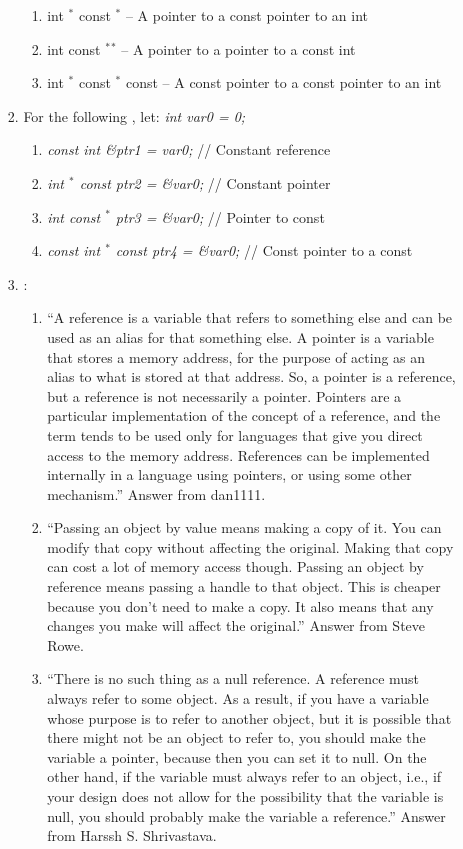\begin{enumerate}
\begin{enumerate}
\begin{enumerate}
\begin{enumerate}
			\item int $^{\ast}$ const $^{\ast}$ -- A pointer to a const pointer to an int
			\item int const $^{\ast}$$^{\ast}$ -- A pointer to a pointer to a const int
			\item int $^{\ast}$ const $^{\ast}$ const -- A const pointer to a const pointer to an int
			\end{enumerate}
		\item For the following \cite{Mortensen2015}, let: {\it int var0 = 0;} \vspace{-0.1cm}
			\begin{enumerate} \itemsep -1pt
			\item {\it const int {\rm \&}ptr1 = var0;} // Constant reference
			\item {\it int $^{\ast}$ const ptr2 = {\rm \&}var0;} // Constant pointer
			\item {\it int const $^{\ast}$ ptr3 = {\rm \&}var0;} // Pointer to const
			\item {\it const int $^{\ast}$ const ptr4 = {\rm \&}var0;} // Const pointer to a const
			\end{enumerate}
		\item \cite{Ozcan2013}: \vspace{-0.1cm}
			\begin{enumerate} \itemsep -1pt
			\item ``A reference is a variable that refers to something else and can be used as an alias for that something else. A pointer is a variable that stores a memory address, for the purpose of acting as an alias to what is stored at that address. So, a pointer is a reference, but a reference is not necessarily a pointer. Pointers are a particular implementation of the concept of a reference, and the term tends to be used only for languages that give you direct access to the memory address. References can be implemented internally in a language using pointers, or using some other mechanism.'' Answer from dan1111.
			\item ``Passing an object by value means making a copy of it. You can modify that copy without affecting the original. Making that copy can cost a lot of memory access though. Passing an object by reference means passing a handle to that object. This is cheaper because you don't need to make a copy. It also means that any changes you make will affect the original.'' Answer from Steve Rowe.
			\item ``There is no such thing as a null reference. A reference must always refer to some object. As a result, if you have a variable whose purpose is to refer to another object, but it is possible that there might not be an object to refer to, you should make the variable a pointer, because then you can set it to null. On the other hand, if the variable must always refer to an object, i.e., if your design does not allow for the possibility that the variable is null, you should probably make the variable a reference.'' Answer from Harssh S. Shrivastava.

\end{enumerate}
\end{enumerate}
\end{enumerate}
\end{enumerate}
